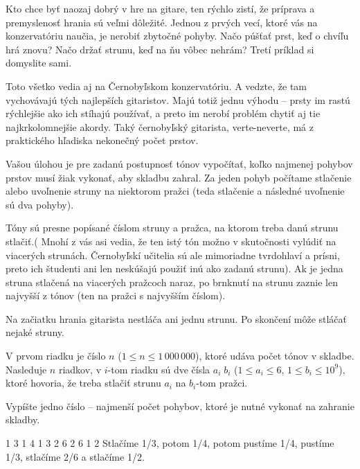 




Kto chce byť naozaj dobrý v hre na gitare, ten rýchlo zistí, že príprava a
premyslenosť hrania sú veľmi dôležité.
Jednou z prvých
vecí, ktoré vás na konzervatóriu naučia, je nerobiť zbytočné pohyby. Načo púšťať
prst, keď o chvíľu hrá znovu? Načo držať strunu, keď na ňu vôbec nehrám? Tretí
príklad si domyslite sami.

Toto všetko vedia aj na Černobyľskom konzervatóriu. A vedzte, že tam vychovávajú
tých najlepších gitaristov. Majú totiž jednu výhodu -- prsty im rastú rýchlejšie ako
ich stíhajú používať, a preto im nerobí problém chytiť aj tie najkrkolomnejšie
akordy. Taký černobyľský gitarista, verte-neverte, má z praktického hľadiska
nekonečný počet prstov.


Vašou úlohou je pre zadanú postupnosť tónov vypočítať, koľko najmenej pohybov
prstov musí žiak vykonať, aby skladbu zahral. Za jeden pohyb počítame
stlačenie alebo uvoľnenie struny na niektorom pražci (teda stlačenie a následné
uvoľnenie sú dva pohyby).

Tóny sú presne popísané číslom struny a pražca, na ktorom treba danú strunu
stlačiť.(
Mnohí z vás asi vedia, že ten istý tón možno v skutočnosti vylúdiť na viacerých
strunách. Černobyľskí učitelia sú ale mimoriadne tvrdohlaví a prísni, preto ich
študenti ani len neskúšajú použiť inú ako zadanú strunu).
Ak je jedna struna stlačená na viacerých pražcoch naraz, po brnknutí na strunu
zaznie len najvyšší z tónov (ten na pražci s najvyšším číslom).

Na začiatku hrania gitarista nestláča ani jednu strunu. Po skončení môže stláčať
nejaké struny.

\vspace{-0.5em}

V prvom riadku je číslo $n$ ($1 \leq n \leq 1\,000\,000$), ktoré udáva počet
tónov v skladbe. Nasleduje $n$ riadkov, v $i$-tom riadku sú dve čísla $a_i \; b_i$
($1 \leq a_i \leq 6$, $1 \leq b_i \leq 10^9$),
ktoré hovoria, že treba stlačiť strunu $a_i$ na $b_i$-tom pražci.

\vspace{-0.5em}

Vypíšte jedno číslo -- najmenší počet pohybov, ktoré je nutné vykonať na
zahranie skladby.


1 3
1 4
1 3
2 6
2 6
1 2
\komentar
Stlačíme 1/3, potom 1/4, potom pustíme 1/4, pustíme 1/3, stlačíme 2/6 a stlačíme
1/2.
\koniec


